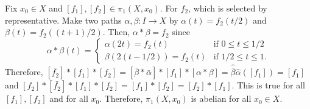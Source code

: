 \documentclass{article}
\begin{document}
Fix $x_0\in X$ and $[f_1], [f_2]\in \pi_1(X, x_0)$. For $f_2$, which is selected by representative. Make two paths $\alpha,\beta:I\rightarrow X$ by $\alpha(t)=f_2(t/2)$ and $\beta(t)=f_2((t+1)/2)$. Then, $\alpha*\beta=f_2$ since 
\begin{equation*}
\alpha*\beta(t)=\begin{cases}
\alpha(2t)=f_2(t) & \text{if }0\leq t \leq 1/2 \\
\beta(2(t-1/2))=f_2(t) & \text{if }1/2\leq t\leq 1.
\end{cases}
\end{equation*}
Therefore, $[\bar{f_2}]*[f_1]*[f_2]=[\bar{\beta}*\bar{\alpha}]*[f_1]*[\alpha*\beta]=\hat{\bar{\beta}}\hat{\alpha}([f_1])=[f_1]$ and $[f_2]*[\bar{f_2}]*[f_1]*[f_2]=[f_1]*[f_2]=[f_2]*[f_1]$. This is true for all $[f_1],[f_2]$ and for all $x_0$. Therefore, $\pi_1(X, x_0)$ is abelian for all $x_0\in X$.
\end{document}
